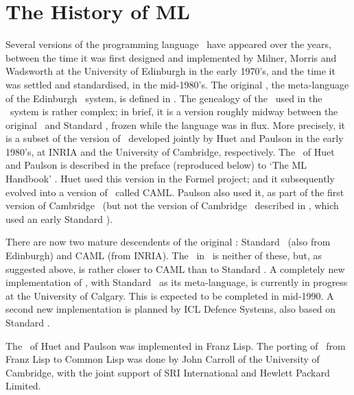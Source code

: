 
\chapter{The History of ML}

Several versions of the programming language
\ML{}\ have appeared  over the  years,
between the time it was first designed and implemented by
Milner, Morris 
and Wadsworth at the University of Edinburgh
in the early 1970's,
and the time it was settled and standardised, in the mid-1980's.
The original \ML, the meta-language of the Edinburgh
\LCF\ system, is defined in \cite{Edinburgh-LCF}.
The genealogy of the \ML\ used in the \HOL\ system is rather complex;
in brief, it is a version roughly midway between the original
\ML\ and Standard \ML, frozen while the language was
in flux. 
More precisely, it is a subset of
the version  of \ML\ developed jointly by  Huet and 
Paulson 
in the early 1980's,
at {\small INRIA} and the University of Cambridge, respectively.
The \ML\ of Huet and Paulson is  described in the
preface (reproduced  below) to `The ML Handbook' \cite{ml-handbook}.   
Huet used this version in the Formel project; and it subsequently
evolved into a version of \ML\ called {\small  CAML}.
Paulson also used it, as part of the first version
of Cambridge \LCF\ (but not the version of
Cambridge \LCF\ described in 
\cite{new-LCF-man}, which used an early Standard \ML).  


There are now
two mature descendents of the original \ML:  Standard \ML\ (also
from Edinburgh) and
{\small CAML} (from {\small INRIA}).  The \ML\ in \HOL{}\ is neither  of these,
but, as suggested above, is rather closer to
{\small  CAML} than  to Standard  \ML.   A completely new
implementation of \HOL, with Standard \ML\ as its meta-language,  is 
currently in
progress at the University of Calgary.   This is expected to be completed
in mid-1990. A second new implementation is planned by ICL Defence Systems,
also based on Standard \ML.

The \ML\ of Huet and Paulson was implemented in Franz Lisp. 
The porting of \HOL\ from Franz Lisp to Common Lisp was  
done by  John Carroll of
the University of Cambridge, with the joint  support of SRI
International and Hewlett Packard Limited.

